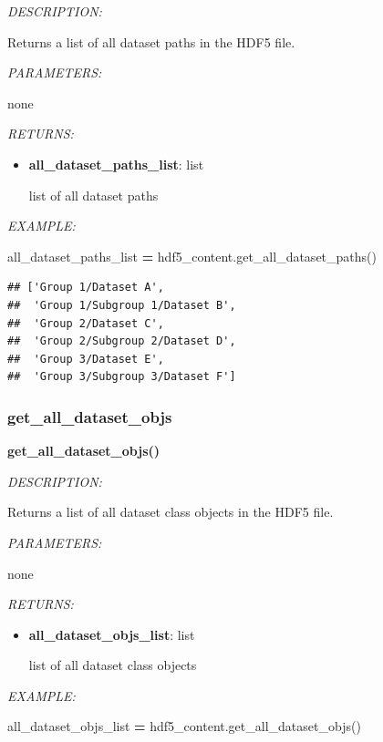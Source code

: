 \documentclass[
]{article}
\newenvironment{Shaded}{\begin{snugshade}}{\end{snugshade}}
\newcommand{\NormalTok}[1]{#1}
\newcommand{\OperatorTok}[1]{\textcolor[rgb]{0.81,0.36,0.00}{\textbf{#1}}}
\begin{document}
\emph{DESCRIPTION:}

Returns a list of all dataset paths in the HDF5 file.

\emph{PARAMETERS:}

none

\emph{RETURNS:}

\begin{itemize}
\item
  \textbf{all\_dataset\_paths\_list}: list

  list of all dataset paths
\end{itemize}

\emph{EXAMPLE:}

\begin{Shaded}
\begin{Highlighting}[]
\NormalTok{all_dataset_paths_list }\OperatorTok{=}\NormalTok{ hdf5_content.get_all_dataset_paths()}
\end{Highlighting}
\end{Shaded}

\begin{verbatim}
## ['Group 1/Dataset A',
##  'Group 1/Subgroup 1/Dataset B',
##  'Group 2/Dataset C',
##  'Group 2/Subgroup 2/Dataset D',
##  'Group 3/Dataset E',
##  'Group 3/Subgroup 3/Dataset F']
\end{verbatim}

\hypertarget{get_all_dataset_objs}{%
\subsubsection{get\_all\_dataset\_objs}\label{get_all_dataset_objs}}

\textbf{get\_all\_dataset\_objs()}

\emph{DESCRIPTION:}

Returns a list of all dataset class objects in the HDF5 file.

\emph{PARAMETERS:}

none

\emph{RETURNS:}

\begin{itemize}
\item
  \textbf{all\_dataset\_objs\_list}: list

  list of all dataset class objects
\end{itemize}

\emph{EXAMPLE:}

\begin{Shaded}
\begin{Highlighting}[]
\NormalTok{all_dataset_objs_list }\OperatorTok{=}\NormalTok{ hdf5_content.get_all_dataset_objs()}
\end{Highlighting}
\end{Shaded}
\end{document}
